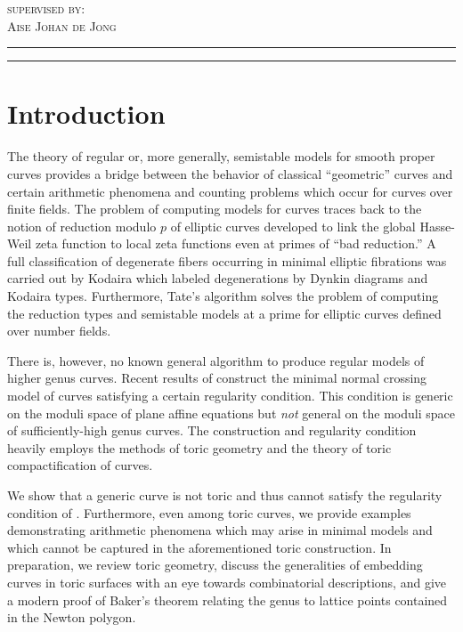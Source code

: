 \documentclass[12pt]{article}
\begin{document}
\begin{titlepage}
	\vspace{0.05 \textheight}
	
	{\textsc{supervised by:}}
	\\
	{\large\textsc{Aise Johan de Jong}}
	
	\vspace{0.1\textheight} %
	
	
	\rule{\textwidth}{0.4pt} %
	
	\vspace{2pt}\vspace{-\baselineskip} %
	
	\rule{\textwidth}{1pt} %
	
\end{titlepage}

\section{Introduction}

The theory of regular or, more generally, semistable models for smooth proper curves provides a bridge between the behavior of classical ``geometric'' curves and certain arithmetic phenomena and counting problems which occur for curves over finite fields. The problem of computing models for curves traces back to the notion of reduction modulo $p$ of elliptic curves developed to link the global Hasse-Weil zeta function to local zeta functions even at primes of ``bad reduction.'' A full classification of degenerate fibers occurring in minimal elliptic fibrations was carried out by Kodaira \cite{kodaira} which labeled degenerations by Dynkin diagrams and Kodaira types. Furthermore, Tate's algorithm \cite{tate} solves the problem of computing the reduction types and semistable models at a prime for elliptic curves defined over number fields.
\par
There is, however, no known general algorithm to produce regular models of higher genus curves. Recent results of \cite{tim} construct the minimal normal crossing model of curves satisfying a certain regularity condition. This condition is generic on the moduli space of plane affine equations but \textit{not} general on the moduli space of sufficiently-high genus curves. The construction and regularity condition heavily employs the methods of toric geometry and the theory of toric compactification of curves.
\par
We show that a generic curve is not toric and thus cannot satisfy the regularity condition of \cite{tim}. Furthermore, even among toric curves, we provide examples demonstrating arithmetic phenomena which may arise in minimal models and which cannot be captured in the aforementioned toric construction. In preparation, we review toric geometry, discuss the generalities of embedding curves in toric surfaces with an eye towards combinatorial descriptions, and give a modern proof of Baker's theorem relating the genus to lattice points contained in the Newton polygon.
\end{document}
